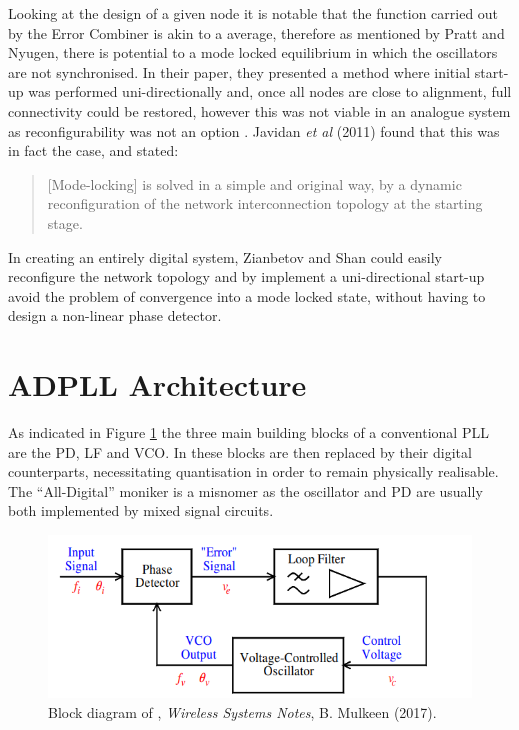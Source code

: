 Looking at the design of a given node it is notable that the function carried out by the Error Combiner is akin to a average, therefore as mentioned by Pratt and Nyugen, there is potential to a mode locked equilibrium in which the oscillators are not synchronised. In their paper, they presented a method where initial start-up was performed uni-directionally and, once all nodes are close to alignment, full connectivity could be restored, however this was not viable in an analogue system as reconfigurability was not an option \cite{pratt1995distributed}. Javidan \textit{et al} (2011) found that this was in fact the case, and stated:
\begin{quote}
	[Mode-locking] is solved in a simple and original way, by a dynamic reconfiguration of the network interconnection topology at the starting stage.
\end{quote}
In creating an entirely digital system, Zianbetov and Shan could easily reconfigure the network topology and by implement a uni-directional start-up avoid the problem of convergence into a mode locked state, without having to design a non-linear phase detector.

\section{\acs{ADPLL} Architecture}
As indicated in Figure \ref{fig:mulkeen_pll} the three main building blocks of a conventional \ac{PLL} are the \ac{PD}, \ac{LF} and \ac{VCO}. In  these blocks are then replaced by their digital counterparts, necessitating quantisation in order to remain physically realisable. The ``All-Digital'' moniker is a misnomer as the oscillator and \acl{PD} are usually both implemented by mixed signal circuits.
\begin{figure}[h]
	\centering
	\includegraphics[scale=0.5]{../tex_files/mulkeen_pll}
	\caption[Block fiagram of ]{Block diagram of , \textit{Wireless Systems Notes}, B. Mulkeen (2017).}
	\label{fig:mulkeen_pll}
\end{figure}

